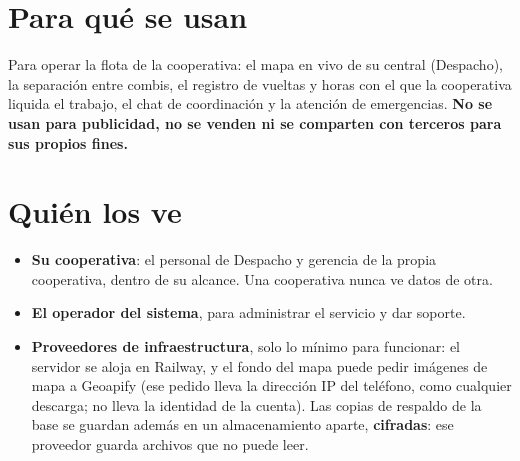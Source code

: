\documentclass[10.5pt,a4paper]{article}
\begin{document}
\section{Para qué se usan}
Para operar la flota de la cooperativa: el mapa en vivo de su central
(Despacho), la separación entre combis, el registro de vueltas y horas con el
que la cooperativa liquida el trabajo, el chat de coordinación y la atención
de emergencias. \textbf{No se usan para publicidad, no se venden ni se
comparten con terceros para sus propios fines.}

\section{Quién los ve}
\begin{itemize}[leftmargin=14pt]
\item \textbf{Su cooperativa}: el personal de Despacho y gerencia de la propia
  cooperativa, dentro de su alcance. Una cooperativa nunca ve datos de otra.
\item \textbf{El operador del sistema}, para administrar el servicio y dar soporte.
\item \textbf{Proveedores de infraestructura}, solo lo mínimo para funcionar: el
  servidor se aloja en Railway, y el fondo del mapa puede pedir imágenes de
  mapa a Geoapify (ese pedido lleva la dirección IP del teléfono, como
  cualquier descarga; no lleva la identidad de la cuenta). Las copias de
  respaldo de la base se guardan además en un almacenamiento aparte,
  \textbf{cifradas}: ese proveedor guarda archivos que no puede leer.
\end{itemize}
\end{document}
